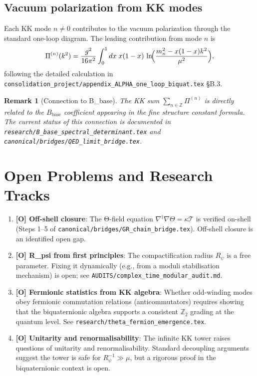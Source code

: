 \documentclass[11pt,a4paper]{article}
\newtheorem{remark}{Remark}
\begin{document}
\subsection{Vacuum polarization from KK modes}

Each KK mode $n \neq 0$ contributes to the vacuum polarization through the
standard one-loop diagram.  The leading contribution from mode $n$ is
\begin{equation}
  \Pi^{(n)}(k^2)
  = \frac{g^2}{16\pi^2} \int_0^1 dx\; x(1-x)\,
    \ln\!\Bigl(\frac{m_n^2 - x(1-x)k^2}{\mu^2}\Bigr),
\end{equation}
following the detailed calculation in
\texttt{consolidation\_project/appendix\_ALPHA\_one\_loop\_biquat.tex} §B.3.

\begin{remark}[Connection to B\_base]
  The KK sum $\sum_{n\in\mathbb{Z}} \Pi^{(n)}$ is directly related to
  the $B_{\mathrm{base}}$ coefficient appearing in the fine structure constant
  formula.  The current status of this connection is documented in
  \texttt{research/B\_base\_spectral\_determinant.tex} and
  \texttt{canonical/bridges/QED\_limit\_bridge.tex}.
\end{remark}

\section{Open Problems and Research Tracks}
\label{sec:open}

\begin{enumerate}
  \item \textbf{[O] Off-shell closure}: The Θ-field equation
    $\nabla^\dagger\nabla\Theta = \kappa\mathcal{T}$ is verified on-shell
    (Steps 1--5 of \texttt{canonical/bridges/GR\_chain\_bridge.tex}).
    Off-shell closure is an identified open gap.

  \item \textbf{[O] R\_psi from first principles}: The compactification
    radius $R_\psi$ is a free parameter.  Fixing it dynamically (e.g.,
    from a moduli stabilisation mechanism) is open; see
    \texttt{AUDITS/complex\_time\_modular\_audit.md}.

  \item \textbf{[O] Fermionic statistics from KK algebra}:
    Whether odd-winding modes obey fermionic commutation relations
    (anticommutators) requires showing that the biquaternionic algebra
    supports a consistent $\mathbb{Z}_2$ grading at the quantum level.
    See \texttt{research/theta\_fermion\_emergence.tex}.

  \item \textbf{[O] Unitarity and renormalisability}:
    The infinite KK tower raises questions of unitarity and
    renormalisability.  Standard decoupling arguments suggest the
    tower is safe for $R_\psi^{-1} \gg \mu$, but a rigorous proof
    in the biquaternionic context is open.
\end{enumerate}
\end{document}
